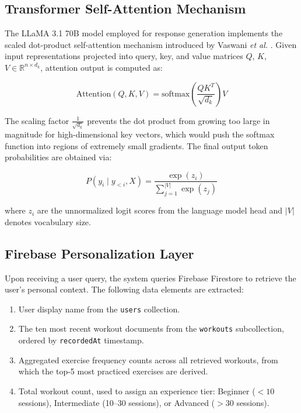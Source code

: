 \documentclass[conference]{IEEEtran}
\begin{document}
\subsection{Transformer Self-Attention Mechanism}

The LLaMA 3.1 70B model employed for response generation implements the scaled dot-product self-attention mechanism introduced by Vaswani \textit{et al.} \cite{vaswani2017attention}. Given input representations projected into query, key, and value matrices $Q$, $K$, $V \in \mathbb{R}^{n \times d_k}$, attention output is computed as:

\begin{equation}
\text{Attention}(Q, K, V) = \text{softmax}\left(\frac{QK^T}{\sqrt{d_k}}\right)V
\label{eq:attention}
\end{equation}

The scaling factor $\frac{1}{\sqrt{d_k}}$ prevents the dot product from growing too large in magnitude for high-dimensional key vectors, which would push the softmax function into regions of extremely small gradients. The final output token probabilities are obtained via:

\begin{equation}
P(y_i \mid y_{<i}, X) = \frac{\exp(z_i)}{\sum_{j=1}^{|V|} \exp(z_j)}
\label{eq:softmax}
\end{equation}

where $z_i$ are the unnormalized logit scores from the language model head and $|V|$ denotes vocabulary size.

\subsection{Firebase Personalization Layer}

Upon receiving a user query, the system queries Firebase Firestore to retrieve the user's personal context. The following data elements are extracted:

\begin{enumerate}
    \item User display name from the \texttt{users} collection.
    \item The ten most recent workout documents from the \texttt{workouts} subcollection, ordered by \texttt{recordedAt} timestamp.
    \item Aggregated exercise frequency counts across all retrieved workouts, from which the top-5 most practiced exercises are derived.
    \item Total workout count, used to assign an experience tier: Beginner ($<10$ sessions), Intermediate (10--30 sessions), or Advanced ($>30$ sessions).
\end{enumerate}
\end{document}
